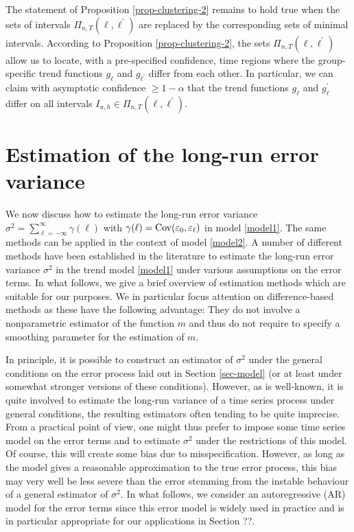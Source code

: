 The statement of Proposition \ref{prop-clustering-2} remains to hold true when the sets of intervals $\Pi_{n,T}(\ell,\ell^\prime)$ are replaced by the corresponding sets of minimal intervals. According to Proposition \ref{prop-clustering-2}, the sets $\Pi_{n,T}(\ell,\ell^\prime)$ allow us to locate, with a pre-specified confidence, time regions where the group-specific trend functions $g_\ell$ and $g_{\ell^\prime}$ differ from each other. In particular, we can claim with asymptotic confidence $\ge 1 - \alpha$ that the trend functions $g_\ell$ and $g_\ell^\prime$ differ on all intervals $I_{u,h} \in \Pi_{n,T}(\ell,\ell^\prime)$. 



\section{Estimation of the long-run error variance}\label{sec-error-var}


We now discuss how to estimate the long-run error variance $\sigma^2 = \sum\nolimits_{\ell=-\infty}^{\infty} \gamma(\ell)$ with $\gamma(\ell) = \textnormal{Cov}(\varepsilon_0,\varepsilon_{\ell})$ in model \eqref{model1}. The same methods can be applied in the context of model \eqref{model2}. A number of different methods have been established in the literature to estimate the long-run error variance $\sigma^2$ in the trend model \eqref{model1} under various assumptions on the error terms. In what follows, we give a brief overview of estimation methods which are suitable for our purposes. We in particular focus attention on difference-based methods as these have the following advantage: They do not involve a nonparametric estimator of the function $m$ and thus do not require to specify a smoothing parameter for the estimation of $m$. 


In principle, it is possible to construct an estimator of $\sigma^2$ under the general conditions on the error process laid out in Section \ref{sec-model} (or at least under somewhat stronger versions of these conditions). However, as is well-known, it is quite involved to estimate the long-run variance of a time series process under general conditions, the resulting estimators often tending to be quite imprecise. From a practical point of view, one might thus prefer to impose some time series model on the error terms and to estimate $\sigma^2$ under the restrictions of this model. Of course, this will create some bias due to misspecification. However, as long as the model gives a reasonable approximation to the true error process, this bias may very well be less severe than the error stemming from the instable behaviour of a general estimator of $\sigma^2$. In what follows, we consider an autoregressive (AR) model for the error terms since this error model is widely used in practice and is in particular appropriate for our applications in Section ??. 



